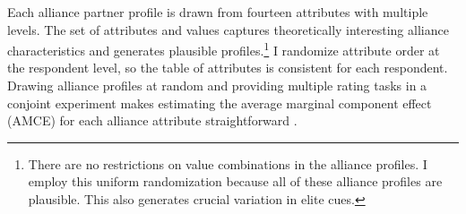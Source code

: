 \documentclass[12pt]{article}
\begin{document}
Each alliance partner profile is drawn from fourteen attributes with multiple levels. 
The set of attributes and values captures theoretically interesting alliance characteristics and generates plausible profiles.\footnote{There are no restrictions on value combinations in the alliance profiles. I employ this uniform randomization because all of these alliance profiles are plausible. This also generates crucial variation in elite cues.}
I randomize attribute order at the respondent level, so the table of attributes is consistent for each respondent. 
Drawing alliance profiles at random and providing multiple rating tasks in a conjoint experiment makes estimating the average marginal component effect (AMCE) for each alliance attribute straightforward \citep{Hainmuelleretal2014}. 
\end{document}
